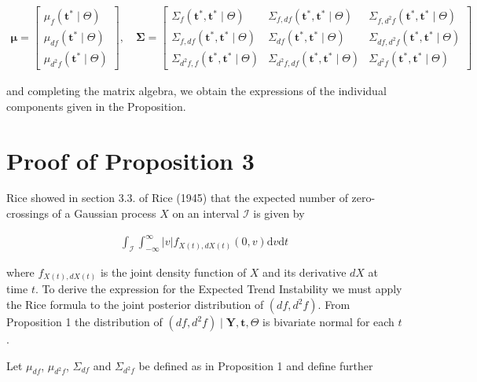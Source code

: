 \documentclass[11pt,]{article}
\theoremstyle{nonumberplain}
\begin{document}
\begin{align*}
  \bm{\mu} = \begin{bmatrix}\mu_f(\mathbf{t}^\ast \mid \Theta)\\ \mu_{df}(\mathbf{t}^\ast \mid \Theta)\\ \mu_{d^2\!f}(\mathbf{t}^\ast \mid \Theta)\end{bmatrix}, \quad \bm{\Sigma} = \begin{bmatrix}\Sigma_{f}(\mathbf{t}^\ast,\mathbf{t}^\ast \mid \Theta) & \Sigma_{f,df}(\mathbf{t}^\ast,\mathbf{t}^\ast \mid \Theta) & \Sigma_{f,d^2\!f}(\mathbf{t}^\ast,\mathbf{t}^\ast \mid \Theta)\\ \Sigma_{f,df}(\mathbf{t}^\ast,\mathbf{t}^\ast \mid \Theta) & \Sigma_{df}(\mathbf{t}^\ast,\mathbf{t}^\ast \mid \Theta) & \Sigma_{df,d^2\!f}(\mathbf{t}^\ast,\mathbf{t}^\ast \mid \Theta)\\ \Sigma_{d^2\!f,f}(\mathbf{t}^\ast,\mathbf{t}^\ast \mid \Theta) & \Sigma_{d^2\!f,df}(\mathbf{t}^\ast,\mathbf{t}^\ast \mid \Theta) & \Sigma_{d^2\!f}(\mathbf{t}^\ast,\mathbf{t}^\ast \mid \Theta)\end{bmatrix}
\end{align*}

and completing the matrix algebra, we obtain the expressions of the
individual components given in the Proposition.

\section{Proof of Proposition 3}\label{sec:appendix2}

Rice showed in section 3.3. of Rice (1945) that the expected number of
zero-crossings of a Gaussian process \(X\) on an interval
\(\mathcal{I}\) is given by

\begin{align}
\int_{\mathcal{I}} \int_{-\infty}^\infty |v|f_{X(t), dX(t)}(0, v)\mathrm{d}v\mathrm{d}t\label{eq:rice}
\end{align}

where \(f_{X(t), dX(t)}\) is the joint density function of \(X\) and its
derivative \(dX\) at time \(t\). To derive the expression for the
Expected Trend Instability we must apply the Rice formula to the joint
posterior distribution of \((df, d^2\!f)\). From Proposition 1 the
distribution of \((df, d^2\!f) \mid \mathbf{Y}, \mathbf{t}, \Theta\) is
bivariate normal for each \(t\).

Let \(\mu_{df}\), \(\mu_{d^2\!f}\), \(\Sigma_{df}\) and
\(\Sigma_{d^2\!f}\) be defined as in Proposition 1 and define further
\end{document}
